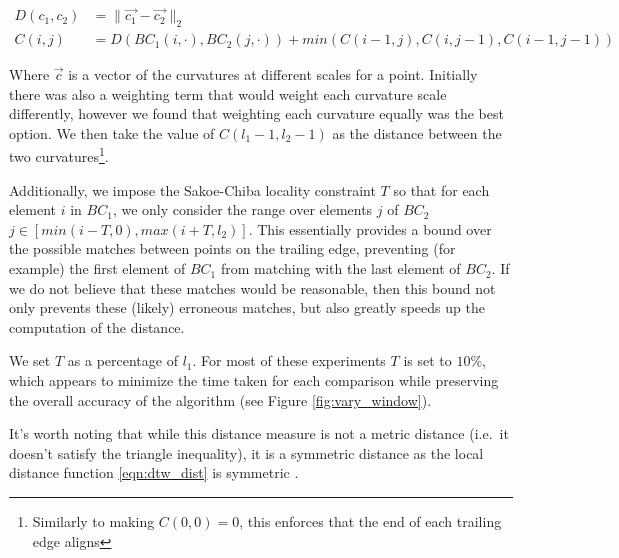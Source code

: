 \begin{align} 
\label{eqn:dtw_dist}
D(c_1, c_2) &= \lVert \vec{c_1} - \vec{c_2} \rVert_2\\
\label{eqn:dtw_update}
C(i,j) &= D(BC_1(i,\cdot),BC_2(j,\cdot)) + min(C(i-1,j), C(i,j-1), C(i-1, j-1))
\end{align}

Where $\vec{c}$ is a vector of the curvatures at different scales for a point.
Initially there was also a weighting term that would weight each curvature scale differently, however we found that weighting each curvature equally was the best option.
We then take the value of $C(l_1-1, l_2-1)$ as the distance between the two curvatures\footnote{Similarly to making $C(0,0) = 0$, this enforces that the end of each trailing edge aligns}.

Additionally, we impose the Sakoe-Chiba \cite{sakoe1978dynamic} locality constraint $T$ so that for each element $i$ in $BC_1$, we only consider the range over elements $j$ of $BC_2$ $j \in [min(i - T, 0), max(i + T, l_2)]$.
This essentially provides a bound over the possible matches between points on the trailing edge, preventing (for example) the first element of $BC_1$ from matching with the last element of $BC_2$.
If we do not believe that these matches would be reasonable, then this bound not only prevents these (likely) erroneous matches, but also greatly speeds up the computation of the distance.

We set $T$ as a percentage of $l_1$.
For most of these experiments $T$ is set to $10\%$, which appears to minimize the time taken for each comparison while preserving the overall accuracy of the algorithm (see Figure \ref{fig:vary_window}).

It's worth noting that while this distance measure is not a metric distance (i.e.\ it doesn't satisfy the triangle inequality), it is a symmetric distance as the local distance function \eqref{eqn:dtw_dist} is symmetric \cite{muller2007information}.



